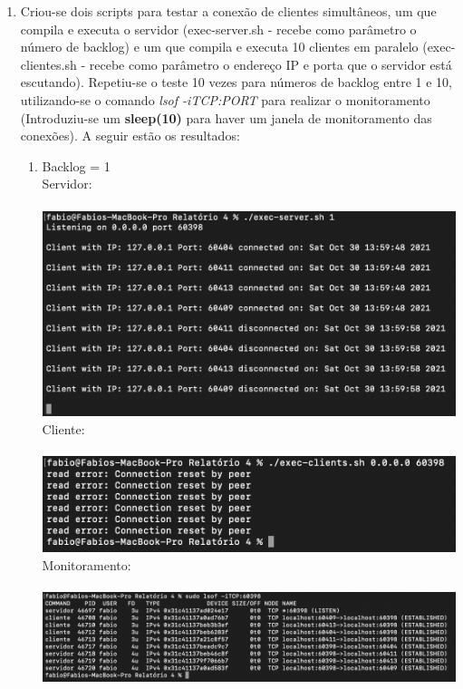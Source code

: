 \documentclass[12pt,a4paper]{report}
\begin{document}
\begin{enumerate}
    \item Criou-se dois scripts para testar a conexão de clientes simultâneos, um que compila e executa o servidor (exec-server.sh - recebe como parâmetro o número de backlog) e um que compila e executa 10 clientes em paralelo (exec-clientes.sh - recebe como parâmetro o endereço IP e porta que o servidor está escutando). Repetiu-se o teste 10 vezes para números de backlog entre 1 e 10,  utilizando-se o comando \textit{lsof -iTCP:PORT} para realizar o monitoramento (Introduziu-se um \textbf{sleep(10)} para haver um janela de monitoramento das conexões). A seguir estão os resultados:
    \begin{enumerate} 
        \item Backlog = 1\\
        Servidor:\\\\
        \includegraphics[width=1\textwidth]{images/servidor-backlog-1.png}
        Cliente:\\\\
        \includegraphics[width=1\textwidth]{images/cliente-backlog-1.png}
        Monitoramento:\\\\
        \includegraphics[width=1\textwidth]{images/lsof-backlog-1.png}
        

\end{enumerate}
\end{enumerate}
\end{document}
